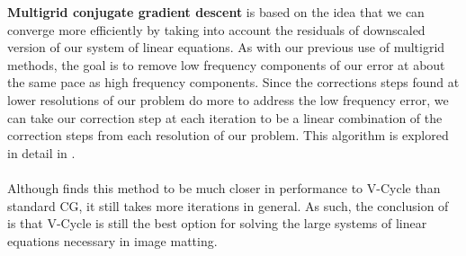 \textbf{Multigrid conjugate gradient descent} is based on the idea that we can converge more efficiently by taking into account the residuals of downscaled version of our system of linear equations. As with our previous use of multigrid methods, the goal is to remove low frequency components of our error at about the same pace as high frequency components. Since the corrections steps found at lower resolutions of our problem do more to address the low frequency error, we can take our correction step at each iteration to be a linear combination of the correction steps from each resolution of our problem. This algorithm is explored in detail in \cite{pflaum08}.
\\\\
Although \cite{lee14} finds this method to be much closer in performance to V-Cycle than standard CG, it still takes more iterations in general. As such, the conclusion of \cite{lee14} is that V-Cycle is still the best option for solving the large systems of linear equations necessary in image matting.